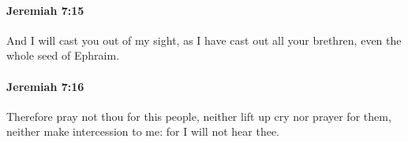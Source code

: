 		\paragraph{Jeremiah 7:15} %
			\label{JEREMIAH-7-15}

			And I will cast you out of my sight, as I have cast out all your brethren, even the whole seed of Ephraim.


		\paragraph{Jeremiah 7:16} %
			\label{JEREMIAH-7-16}

			Therefore pray not thou for this people, neither lift up cry nor prayer for them, neither make intercession to me: for I will not hear thee.


